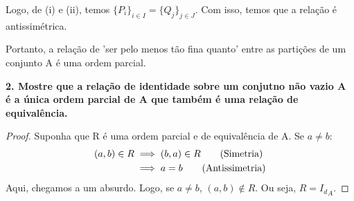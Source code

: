 Logo, de (i) e (ii), temos $\{P_i\}_{i \in I} = \{Q_j\}_{j \in J}$. Com isso, temos que a relação é antissimétrica.

Portanto, a  relação de 'ser pelo menos tão fina quanto' entre as partições de um conjunto A é uma ordem parcial.

\bigskip

\textbf{2. Mostre que a relação de identidade sobre um conjutno não vazio A é a única ordem parcial de A que também é uma relação de equivalência.}

\begin{proof}
	Suponha que R é uma ordem parcial e de equivalência de A.
	Se $a \neq b$:
	\begin{align*}
		(a, b) \in R
		 & \implies (b, a) \in R \tag*{\text{(Simetria)}} \\
		 & \implies a = b \tag*{\text{(Antissimetria)}}
	\end{align*}
	Aqui, chegamos a um absurdo. Logo, se $ a \neq b$, $(a,b) \notin R$. Ou seja, $R = {I_d}_A$.
\end{proof}

\bigskip


